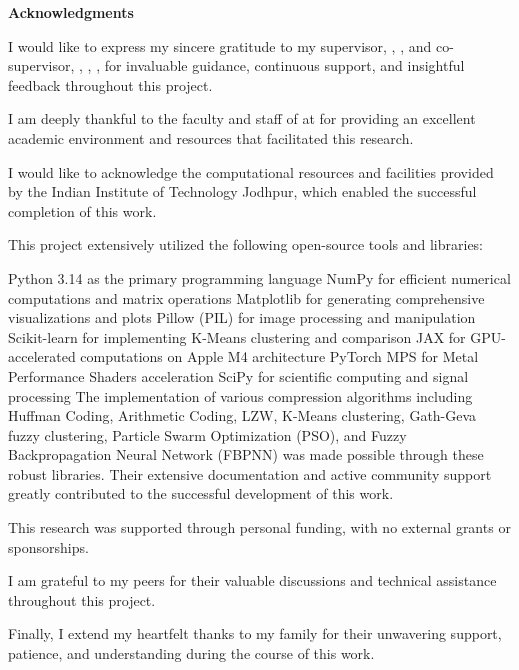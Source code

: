 \begin{flushright}
\huge{\textbf{Acknowledgments}}
\end{flushright}

\vspace{0.5cm}

I would like to express my sincere gratitude to my supervisor, , ,  and co-supervisor, , , , for invaluable guidance, continuous support, and insightful feedback throughout this project.

I am deeply thankful to the faculty and staff of  at  for providing an excellent academic environment and resources that facilitated this research.

I would like to acknowledge the computational resources and facilities provided by the Indian Institute of Technology Jodhpur, which enabled the successful completion of this work.

This project extensively utilized the following open-source tools and libraries:

Python 3.14 as the primary programming language
NumPy for efficient numerical computations and matrix operations
Matplotlib for generating comprehensive visualizations and plots
Pillow (PIL) for image processing and manipulation
Scikit-learn for implementing K-Means clustering and comparison
JAX for GPU-accelerated computations on Apple M4 architecture
PyTorch MPS for Metal Performance Shaders acceleration
SciPy for scientific computing and signal processing
The implementation of various compression algorithms including Huffman Coding, Arithmetic Coding, LZW, K-Means clustering, Gath-Geva fuzzy clustering, Particle Swarm Optimization (PSO), and Fuzzy Backpropagation Neural Network (FBPNN) was made possible through these robust libraries. Their extensive documentation and active community support greatly contributed to the successful development of this work.

This research was supported through personal funding, with no external grants or sponsorships.

I am grateful to my peers for their valuable discussions and technical assistance throughout this project.

Finally, I extend my heartfelt thanks to my family for their unwavering support, patience, and understanding during the course of this work.

\vspace{2cm}

\begin{flushright}
\textbf{\authorname}\
\rn
\end{flushright}
